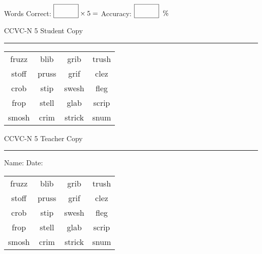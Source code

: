 \documentclass{memoir}
\begin{document}
\small

Words Correct: $\fbox{\phantom{\huge 100}} \times 5 = $ Accuracy: $\fbox{\phantom{\huge 100}}\;\; \%$ 

\vfill

\newpage


\footnotesize \noindent
CCVC-N 5 \hfill Student Copy
\smallskip
\hrule

\Large

\setlength{\tabcolsep}{14pt}
\def\arraystretch{3}

{\selectfont


\begin{vplace}[0.5]
\begin{center}
\begin{tabular}{cccc}
fruzz & blib             & grib     & trush \\
stoff & pruss       & grif      & clez \\
crob & stip & swesh & fleg             \\
frop & stell & glab & scrip \\
smosh & crim & strick & snum \\
\end{tabular}
\end{center}
\end{vplace}

}

\newpage

\footnotesize \noindent
CCVC-N 5 \hfill Teacher Copy
\smallskip
\hrule

\small

\vfill

\noindent
Name: \underline{\hspace{1.75in}} \hfill Date: \underline{\hspace{1in}}

\Large

{\selectfont


\begin{vplace}[0.5]
\begin{center}
\begin{tabular}{cccc}
fruzz & blib             & grib     & trush \\
stoff & pruss       & grif      & clez \\
crob & stip & swesh & fleg             \\
frop & stell & glab & scrip \\
smosh & crim & strick & snum \\
\end{tabular}
\end{center}
\end{vplace}



}
\end{document}
